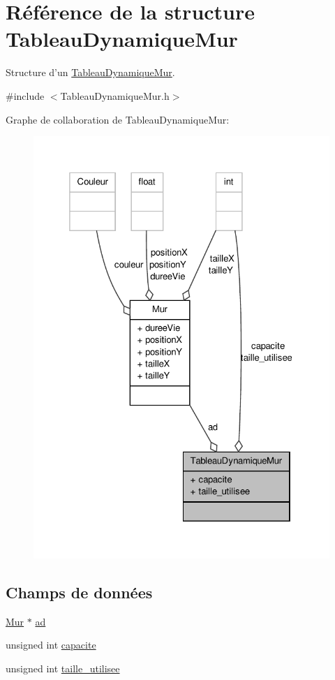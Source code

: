 \hypertarget{structTableauDynamiqueMur}{\section{Référence de la structure Tableau\-Dynamique\-Mur}
\label{structTableauDynamiqueMur}
}


Structure d'un \hyperlink{structTableauDynamiqueMur}{Tableau\-Dynamique\-Mur}.  




{\ttfamily \#include $<$Tableau\-Dynamique\-Mur.\-h$>$}



Graphe de collaboration de Tableau\-Dynamique\-Mur\-:\nopagebreak
\begin{figure}[H]
\begin{center}
\leavevmode
\includegraphics[width=325pt]{structTableauDynamiqueMur__coll__graph}
\end{center}
\end{figure}
\subsection*{Champs de données}
\begin{DoxyCompactItemize}
\item 
\hyperlink{structMur}{Mur} $\ast$ \hyperlink{structTableauDynamiqueMur_a922754666b4214fea4cb56fdacddc2e4}{ad}
\item 
unsigned int \hyperlink{structTableauDynamiqueMur_a3ac67653487ce5f4ae8e1c2626469f45}{capacite}
\item 
unsigned int \hyperlink{structTableauDynamiqueMur_a10c3a4a33a8a9071a70788920a8459b5}{taille\-\_\-utilisee}
\end{DoxyCompactItemize}


